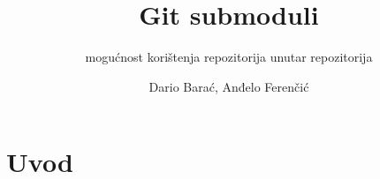 \documentclass[10pt]{beamer}
\title{Git submoduli}
\subtitle{mogućnost korištenja repozitorija unutar repozitorija}
\date{}
\author{Dario Barać, Anđelo Ferenčić}
\begin{document}
\maketitle


\section{Uvod}


\begin{frame}

\end{frame}
\end{document}
